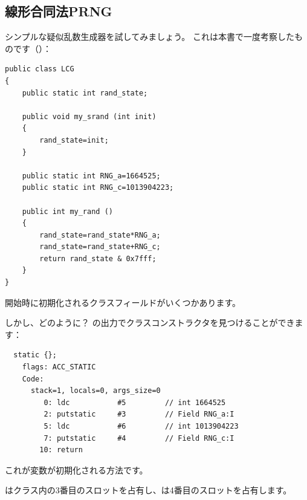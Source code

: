 \subsection{線形合同法\ac{PRNG}}

シンプルな疑似乱数生成器を試してみましょう。
これは本書で一度考察したものです（）：

\begin{lstlisting}[style=customjava]
public class LCG 
{
	public static int rand_state;

	public void my_srand (int init)
	{
		rand_state=init;
	}

	public static int RNG_a=1664525;
	public static int RNG_c=1013904223;

	public int my_rand ()
	{
		rand_state=rand_state*RNG_a;
		rand_state=rand_state+RNG_c;
		return rand_state & 0x7fff;
	}
}
\end{lstlisting}

開始時に初期化されるクラスフィールドがいくつかあります。

しかし、どのように？
の出力でクラスコンストラクタを見つけることができます：

\begin{lstlisting}
  static {};
    flags: ACC_STATIC
    Code:
      stack=1, locals=0, args_size=0
         0: ldc           #5         // int 1664525
         2: putstatic     #3         // Field RNG_a:I
         5: ldc           #6         // int 1013904223
         7: putstatic     #4         // Field RNG_c:I
        10: return        
\end{lstlisting}

これが変数が初期化される方法です。

はクラス内の3番目のスロットを占有し、は4番目のスロットを占有します。